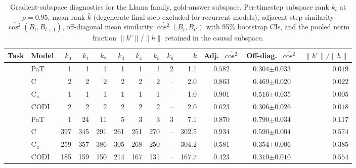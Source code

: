 \begin{table}[h!]
\centering
\small
\setlength{\tabcolsep}{2.5pt}
\caption{Gradient-subspace diagnostics for the Llama family, gold-answer subspace. Per-timestep subspace rank $k_t$ at $\rho{=}0.95$, mean rank $\bar k$ (degenerate final step excluded for recurrent models), adjacent-step similarity $\overline{\cos^2}(B_t, B_{t+1})$, off-diagonal mean similarity $\overline{\cos^2}(B_t, B_{t'})$ with 95\% bootstrap CIs, and the pooled norm fraction $\|h^c\|/\|h\|$ retained in the causal subspace.}
\label{tab:subspace_geometry_llama}
\begin{tabular}{llrrrrrrrrccr}
\toprule
Task & Model & $k_{0}$ & $k_{1}$ & $k_{2}$ & $k_{3}$ & $k_{4}$ & $k_{5}$ & $k_{6}$ & $\bar k$ & Adj.\ $\overline{\cos^2}$ & Off-diag.\ $\overline{\cos^2}$ & $\|h^c\|/\|h\|$ \\
\midrule
{} & PaT & 1 & 1 & 1 & 1 & 1 & 1 & 2 & 1.1 & $0.582$ & $0.304 {\scriptstyle \pm 0.033}$ & $0.019$ \\
 & C & 2 & 2 & 2 & 2 & 2 & 2 & \textcolor{gray}{--} & 2.0 & $0.863$ & $0.469 {\scriptstyle \pm 0.020}$ & $0.022$ \\
 & C$_u$ & 1 & 1 & 1 & 1 & 1 & 1 & \textcolor{gray}{--} & 1.0 & $0.901$ & $0.516 {\scriptstyle \pm 0.035}$ & $0.005$ \\
 & CODI & 2 & 2 & 2 & 2 & 2 & 2 & \textcolor{gray}{--} & 2.0 & $0.623$ & $0.306 {\scriptstyle \pm 0.026}$ & $0.018$ \\
\midrule
{} & PaT & 1 & 24 & 11 & 5 & 3 & 3 & 3 & 7.1 & $0.870$ & $0.790 {\scriptstyle \pm 0.034}$ & $0.117$ \\
 & C & 397 & 345 & 291 & 261 & 251 & 270 & \textcolor{gray}{--} & 302.5 & $0.934$ & $0.590 {\scriptstyle \pm 0.004}$ & $0.574$ \\
 & C$_u$ & 259 & 357 & 386 & 305 & 268 & 250 & \textcolor{gray}{--} & 304.2 & $0.581$ & $0.354 {\scriptstyle \pm 0.006}$ & $0.385$ \\
 & CODI & 185 & 159 & 150 & 214 & 167 & 131 & \textcolor{gray}{--} & 167.7 & $0.423$ & $0.310 {\scriptstyle \pm 0.010}$ & $0.554$ \\
\bottomrule
\end{tabular}
\end{table}